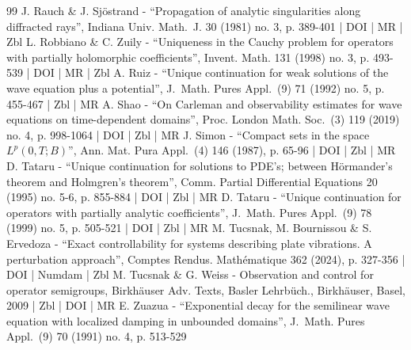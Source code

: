 \begin{thebibliography}{99}
J. Rauch \& J. Sjöstrand - “Propagation of analytic singularities along diffracted rays”, Indiana Univ. Math. J. 30 (1981) no. 3, p. 389-401 | DOI | MR | Zbl
L. Robbiano \& C. Zuily - “Uniqueness in the Cauchy problem for operators with partially holomorphic coefficients”, Invent. Math. 131 (1998) no. 3, p. 493-539 | DOI | MR | Zbl
A. Ruiz - “Unique continuation for weak solutions of the wave equation plus a potential”, J. Math. Pures Appl. (9) 71 (1992) no. 5, p. 455-467 | Zbl | MR
A. Shao - “On Carleman and observability estimates for wave equations on time-dependent domains”, Proc. London Math. Soc. (3) 119 (2019) no. 4, p. 998-1064 | DOI | Zbl | MR
J. Simon - “Compact sets in the space $L^p(0,T;B)$”, Ann. Mat. Pura Appl. (4) 146 (1987), p. 65-96 | DOI | Zbl | MR
D. Tataru - “Unique continuation for solutions to PDE’s; between Hörmander’s theorem and Holmgren’s theorem”, Comm. Partial Differential Equations 20 (1995) no. 5-6, p. 855-884 | DOI | Zbl | MR
D. Tataru - “Unique continuation for operators with partially analytic coefficients”, J. Math. Pures Appl. (9) 78 (1999) no. 5, p. 505-521 | DOI | Zbl | MR
M. Tucsnak, M. Bournissou \& S. Ervedoza - “Exact controllability for systems describing plate vibrations. A perturbation approach”, Comptes Rendus. Mathématique 362 (2024), p. 327-356 | DOI | Numdam | Zbl
M. Tucsnak \& G. Weiss - Observation and control for operator semigroups, Birkhäuser Adv. Texts, Basler Lehrbüch., Birkhäuser, Basel, 2009 | Zbl | DOI | MR
E. Zuazua - “Exponential decay for the semilinear wave equation with localized damping in unbounded domains”, J. Math. Pures Appl. (9) 70 (1991) no. 4, p. 513-529
\end{thebibliography}
